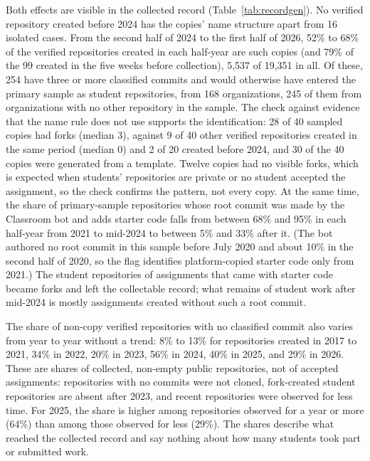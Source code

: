 \documentclass[acmsmall,screen,review,anonymous]{acmart}
\begin{document}
Both effects are visible in the collected record (Table~\ref{tab:recordgen}). No verified repository created before 2024 has the copies' name structure apart from 16 isolated cases. From the second half of 2024 to the first half of 2026, 52\% to 68\% of the verified repositories created in each half-year are such copies (and 79\% of the 99 created in the five weeks before collection), 5,537 of 19,351 in all. Of these, 254 have three or more classified commits and would otherwise have entered the primary sample as student repositories, from 168 organizations, 245 of them from organizations with no other repository in the sample. The check against evidence that the name rule does not use supports the identification: 28 of 40 sampled copies had forks (median 3), against 9 of 40 other verified repositories created in the same period (median 0) and 2 of 20 created before 2024, and 30 of the 40 copies were generated from a template. Twelve copies had no visible forks, which is expected when students' repositories are private or no student accepted the assignment, so the check confirms the pattern, not every copy. At the same time, the share of primary-sample repositories whose root commit was made by the Classroom bot and adds starter code falls from between 68\% and 95\% in each half-year from 2021 to mid-2024 to between 5\% and 33\% after it. (The bot authored no root commit in this sample before July 2020 and about 10\% in the second half of 2020, so the flag identifies platform-copied starter code only from 2021.) The student repositories of assignments that came with starter code became forks and left the collectable record; what remains of student work after mid-2024 is mostly assignments created without such a root commit.



The share of non-copy verified repositories with no classified commit also varies from year to year without a trend: 8\% to 13\% for repositories created in 2017 to 2021, 34\% in 2022, 20\% in 2023, 56\% in 2024, 40\% in 2025, and 29\% in 2026. These are shares of collected, non-empty public repositories, not of accepted assignments: repositories with no commits were not cloned, fork-created student repositories are absent after 2023, and recent repositories were observed for less time. For 2025, the share is higher among repositories observed for a year or more (64\%) than among those observed for less (29\%). The shares describe what reached the collected record and say nothing about how many students took part or submitted work.
\end{document}
